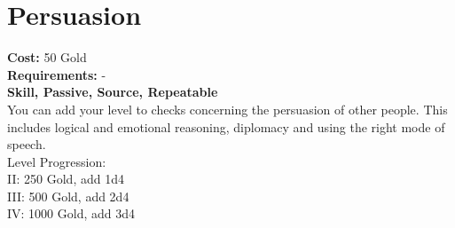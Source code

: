 \section*{Persuasion}
\textbf{Cost:} 50 Gold\\
\textbf{Requirements:} -\\
\textbf{Skill, Passive, Source, Repeatable}\\
You can add your level to checks concerning the persuasion of other people. This includes logical and emotional reasoning, diplomacy and using the right mode of speech.
\\
Level Progression:\\
II: 250 Gold, add 1d4\\
III: 500 Gold, add 2d4\\
IV: 1000 Gold, add 3d4\\